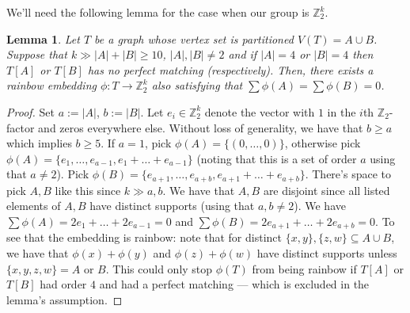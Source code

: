 \documentclass[a4paper,11pt,hidelinks]{amsart}
\newtheorem{lemma}[theorem]{Lemma}
\theoremstyle{definition}
\begin{document}
We'll need the following lemma for the case when our group is $\mathbb{Z}_2^k$.
\begin{lemma}\label{Lemma_zero_sum_sets_Z2k}
Let $T$ be a graph whose vertex set is partitioned $V(T)=A\cup B$. Suppose that $k\gg |A|+|B|\ge 10$, $|A|, |B|\ne 2$ and if $|A|=4$ or $|B|=4$ then $T[A]$ or $T[B]$ has no perfect matching (respectively). Then, there exists a rainbow embedding $\phi: T \to \mathbb{Z}_2^k$ also satisfying that $\sum \phi(A)=\sum \phi(B)=0$.
\end{lemma}
\begin{proof}
Set $a:=|A|$, $b:=|B|$. 
Let $e_i\in \mathbb{Z}_2^k$ denote the vector with $1$ in the $i$th $\mathbb{Z}_2$-factor and zeros everywhere else.
Without loss of generality, we have that $b\geq a$ which implies $b\geq 5$. If $a=1$, pick $\phi(A)=\{(0, \dots, 0)\}$, otherwise pick $\phi(A)=\{e_1, \dots, e_{a-1}, e_1+\dots + e_{a-1}\}$ (noting that this is a set of order $a$ using that $a\ne 2$).
Pick $\phi(B)=\{e_{a+1}, \dots, e_{a+b}, e_{a+1}+ \dots+ e_{a+b}\}$. There's space to pick $A,B$ like this since $k\gg a,b$.
We have that $A,B$ are disjoint since all listed elements of $A,B$ have distinct supports (using that $a,b\neq 2$). We have $\sum \phi(A)=2e_1+\dots + 2e_{a-1}=0$ and $\sum \phi(B)= 2e_{a+1}+ \dots+ 2e_{a+b}=0$.
To see that the embedding is rainbow: note that for distinct $\{x,y\}, \{z,w\}\subseteq A\cup B$,  we have that $\phi(x)+\phi(y)$ and $\phi(z)+\phi(w)$ have distinct supports unless $\{x,y,z,w\}= A$ or $B$. This could only stop $\phi(T)$ from being rainbow if $T[A]$ or $T[B]$ had order $4$ and had a perfect matching --- which is excluded in the lemma's assumption.
\end{proof}
\end{document}
